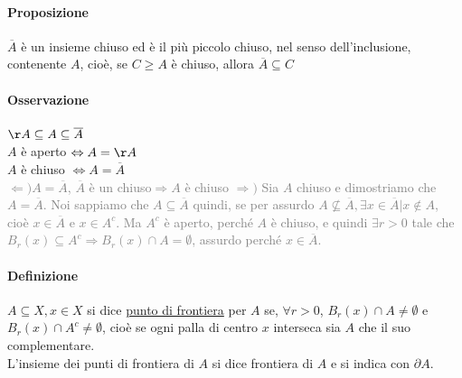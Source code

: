 \documentclass{article}
\begin{document}
\paragraph{{Proposizione}}
$\overline{A} $ è un insieme chiuso ed è il più piccolo chiuso, nel senso dell'inclusione, contenente $A$, cioè, se $C \geq A$ è chiuso, allora $\overline{A}\subseteq C$


\paragraph{Osservazione}
$\AA \subseteq A \subseteq \overline{A}$\\
$A $ è aperto $\Leftrightarrow A= \AA$\\
$A$ è chiuso $\Leftrightarrow A=\overline{A}$\\
\textcolor{grey}{$\Leftarrow) A=\overline{A}$, $\overline{A}$ è un chiuso$\Rightarrow A$ è chiuso $\Rightarrow)$ Sia $A$ chiuso e dimostriamo che $A=\overline{A}$. Noi sappiamo che $A \subseteq \overline{A}$ quindi, se per assurdo $A \nsubseteq \overline{A}, \exists x \in \overline{A}| x \notin A$, cioè $x \in \overline{A}$ e $x \in A^c$. Ma $ A^c $ è aperto, perché $ A $ è chiuso, e quindi $ \exists r >0 $ tale che $ B_r (x) \subseteq A^c \Rightarrow B_r (x) \cap A = \emptyset$, assurdo perché $x \in \overline{A}$.}

\paragraph{Definizione}
$A \subseteq X, x \in X$ si dice \underline{punto di frontiera} per $A$ se, $\forall r>0$, $B_r(x) \cap A \neq \emptyset$ e $B_r(x) \cap A^c \neq \emptyset$, cioè se ogni palla di centro $x$ interseca sia $A$ che il suo complementare.\\
L'insieme dei punti di frontiera di $A$ si dice frontiera di $A$ e si indica con $\partial A$. 
\end{document}
